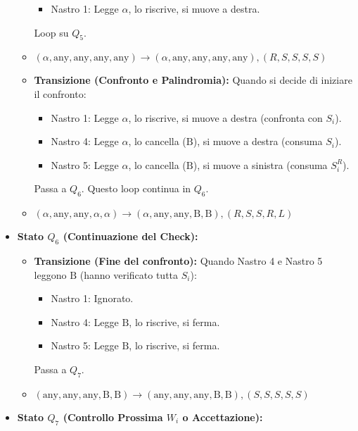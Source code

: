 \documentclass[a4paper]{article}
\newcommand{\B}{\text{B}} %
\newcommand{\alphaSym}{\alpha} %
\begin{document}
\begin{itemize}
\begin{itemize}
\begin{itemize}
                    \item Nastro 1: Legge $\alpha$, lo riscrive, si muove a destra.
                \end{itemize}
                Loop su $Q_5$.
                \item $(\alpha, \text{any}, \text{any}, \text{any}, \text{any}) \to (\alpha, \text{any}, \text{any}, \text{any}, \text{any}), (R,S,S,S,S)$
            \item \textbf{Transizione (Confronto e Palindromia):}
                Quando si decide di iniziare il confronto:
                \begin{itemize}
                    \item Nastro 1: Legge $\alphaSym$, lo riscrive, si muove a destra (confronta con $S_i$).
                    \item Nastro 4: Legge $\alphaSym$, lo cancella ($\B$), si muove a destra (consuma $S_i$).
                    \item Nastro 5: Legge $\alphaSym$, lo cancella ($\B$), si muove a sinistra (consuma $S_i^R$).
                \end{itemize}
                Passa a $Q_6$. Questo loop continua in $Q_6$.
                \item $(\alphaSym, \text{any}, \text{any}, \alphaSym, \alphaSym) \to (\alphaSym, \text{any}, \text{any}, \B, \B), (R,S,S,R,L)$
        \end{itemize}
    \item \textbf{Stato $Q_6$ (Continuazione del Check):}
        \begin{itemize}
            \item \textbf{Transizione (Fine del confronto):}
                Quando Nastro 4 e Nastro 5 leggono $\B$ (hanno verificato tutta $S_i$):
                \begin{itemize}
                    \item Nastro 1: Ignorato.
                    \item Nastro 4: Legge $\B$, lo riscrive, si ferma.
                    \item Nastro 5: Legge $\B$, lo riscrive, si ferma.
                \end{itemize}
                Passa a $Q_7$.
                \item $(\text{any}, \text{any}, \text{any}, \B, \B) \to (\text{any}, \text{any}, \text{any}, \B, \B), (S,S,S,S,S)$
        \end{itemize}
    \item \textbf{Stato $Q_7$ (Controllo Prossima $W_i$ o Accettazione):}

\end{itemize}
\end{document}
